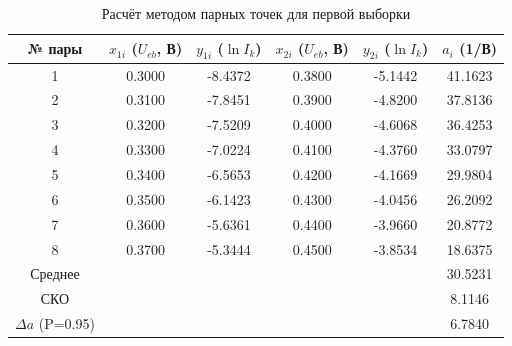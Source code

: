 \begin{table}[h]
\centering
\caption{Расчёт методом парных точек для первой выборки}
\label{tab:pairs}
\begin{tabular}{|c|c|c|c|c|c|}
\hline
№ пары & $x_{1i}$ ($U_{eb}$, В) & $y_{1i}$ ($\ln I_k$) & $x_{2i}$ ($U_{eb}$, В) & $y_{2i}$ ($\ln I_k$) & $a_i$ (1/В) \\
\hline
1 & 0.3000 & -8.4372 & 0.3800 & -5.1442 & 41.1623 \\
2 & 0.3100 & -7.8451 & 0.3900 & -4.8200 & 37.8136 \\
3 & 0.3200 & -7.5209 & 0.4000 & -4.6068 & 36.4253 \\
4 & 0.3300 & -7.0224 & 0.4100 & -4.3760 & 33.0797 \\
5 & 0.3400 & -6.5653 & 0.4200 & -4.1669 & 29.9804 \\
6 & 0.3500 & -6.1423 & 0.4300 & -4.0456 & 26.2092 \\
7 & 0.3600 & -5.6361 & 0.4400 & -3.9660 & 20.8772 \\
8 & 0.3700 & -5.3444 & 0.4500 & -3.8534 & 18.6375 \\
\hline
Среднее & & & & & 30.5231 \\
СКО & & & & & 8.1146 \\
$\Delta a$ (P=0.95) & & & & & 6.7840 \\
\hline
\end{tabular}
\end{table}
